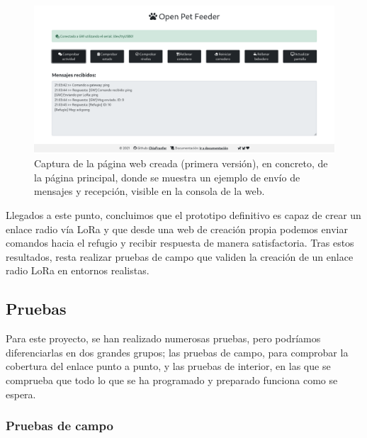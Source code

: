 \documentclass[12pt]{article}
\begin{document}
	\pagebreak
	
	
	\begin{figure}[h!]
		\begin{center}
			\includegraphics[width=1\textwidth]{img/captura_web_2.png}
			\caption{Captura de la página web creada (primera versión), en concreto, de la página principal, donde se muestra un ejemplo de envío de mensajes y recepción, visible en la consola de la web.}
			\label{Web: captura ejemplo consola}
		\end{center}
	\end{figure}

	\noindent Llegados a este punto, concluimos que el prototipo definitivo es capaz de crear un enlace radio vía LoRa y que desde una web de creación propia podemos enviar comandos hacia el refugio y recibir respuesta de manera satisfactoria. Tras estos resultados, resta realizar pruebas de campo que validen la creación de un enlace radio LoRa en entornos realistas.\\
	
	\pagebreak
	
	\subsection[Pruebas]{Pruebas}
	
	\noindent Para este proyecto, se han realizado numerosas pruebas, pero podríamos diferenciarlas en dos grandes grupos; las pruebas de campo, para comprobar la cobertura del enlace punto a punto, y las pruebas de interior, en las que se comprueba que todo lo que se ha programado y preparado funciona como se espera. \\
	
	\subsubsection{Pruebas de campo}
	
\end{document}
